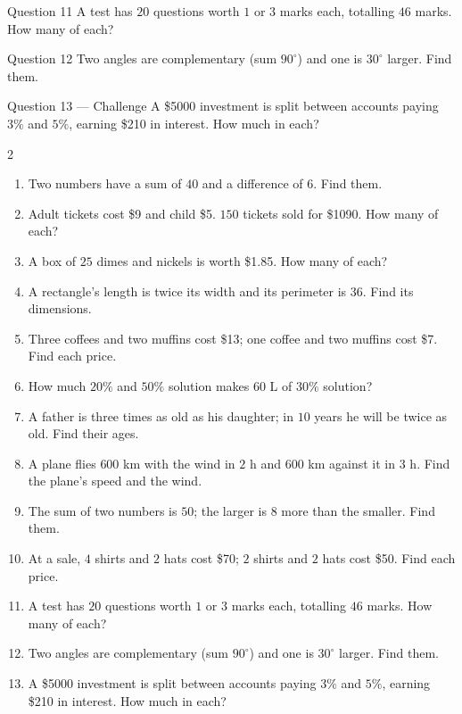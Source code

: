 \documentclass[11pt]{article}
\begin{document}
\begin{qbox}{Question 11}
A test has $20$ questions worth $1$ or $3$ marks each, totalling $46$ marks. How many of each?\workspace{2.8cm}
\end{qbox}

\begin{qbox}{Question 12}
Two angles are complementary (sum $90^\circ$) and one is $30^\circ$ larger. Find them.\workspace{2.4cm}
\end{qbox}

\begin{qbox}{Question 13 --- Challenge}
A \$5000 investment is split between accounts paying $3\%$ and $5\%$, earning \$210 in interest. How much in each?\workspace{3.2cm}
\end{qbox}

\clearpage
{}

\begin{recapbox}
\begin{multicols}{2}
\small
\begin{enumerate}[leftmargin=*,itemsep=3pt]
  \item Two numbers have a sum of $40$ and a difference of $6$. Find them.
  \item Adult tickets cost \$9 and child \$5. $150$ tickets sold for \$1090. How many of each?
  \item A box of $25$ dimes and nickels is worth \$1.85. How many of each?
  \item A rectangle's length is twice its width and its perimeter is $36$. Find its dimensions.
  \item Three coffees and two muffins cost \$13; one coffee and two muffins cost \$7. Find each price.
  \item How much $20\%$ and $50\%$ solution makes $60$ L of $30\%$ solution?
  \item A father is three times as old as his daughter; in $10$ years he will be twice as old. Find their ages.
  \item A plane flies $600$ km with the wind in $2$ h and $600$ km against it in $3$ h. Find the plane's speed and the wind.
  \item The sum of two numbers is $50$; the larger is $8$ more than the smaller. Find them.
  \item At a sale, $4$ shirts and $2$ hats cost \$70; $2$ shirts and $2$ hats cost \$50. Find each price.
  \item A test has $20$ questions worth $1$ or $3$ marks each, totalling $46$ marks. How many of each?
  \item Two angles are complementary (sum $90^\circ$) and one is $30^\circ$ larger. Find them.
  \item A \$5000 investment is split between accounts paying $3\%$ and $5\%$, earning \$210 in interest. How much in each?
\end{enumerate}
\end{multicols}
\end{recapbox}
\end{document}
